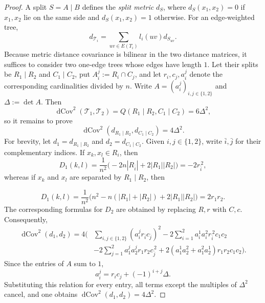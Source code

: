 \documentclass[12pt]{article}
\DeclareMathOperator{\dCov}{dCov}
\begin{document}
\begin{proof}
A split $S=A\mid B$ defines the \emph{split metric} $d_S$, where
$d_S(x_1,x_2)=0$ if $x_1,x_2$ lie on the same side and $d_S(x_1,x_2)=1$
otherwise.  For an edge-weighted tree,
\begin{equation}\label{eq:display-078}
d_{\mathcal T_i}=\sum_{uv\in E(T_i)}l_i(uv)d_{S_{uv}}.
\end{equation}
Because metric distance covariance is bilinear in the two distance
matrices, it suffices to consider two one-edge trees whose edges have
length $1$.  Let their splits be $R_1\mid R_2$ and $C_1\mid C_2$, put
$A_i^j:=R_i\cap C_j$, and let $r_i,c_j,a_i^j$ denote the corresponding
cardinalities divided by $n$.  Write $A=(a_i^j)_{i,j\in\{1,2\}}$ and
$\Delta:=\det A$.
Then
\begin{equation}\label{eq:display-079}
\dCov^2(\mathcal T_1,\mathcal T_2)
=Q(R_1\mid R_2,C_1\mid C_2)=6\Delta^2,
\end{equation}
so it remains to prove
\begin{equation}\label{eq:display-080}
\dCov^2(d_{R_1\mid R_2},d_{C_1\mid C_2})=4\Delta^2.
\end{equation}
For brevity, let $d_1=d_{R_1\mid R_2}$ and
$d_2=d_{C_1\mid C_2}$.  Given $i,j\in\{1,2\}$, write $\bar i,\bar j$
for their complementary indices.  If $x_k,x_l\in R_i$, then
\begin{equation}\label{eq:display-081}
D_1(k,l)=\frac1{n^2}
\bigl(-2n|R_{\bar i}|+2|R_1||R_2|\bigr)=-2r_{\bar i}^{\,2},
\end{equation}
whereas if $x_k$ and $x_l$ are separated by $R_1\mid R_2$, then

\begin{equation}\label{eq:display-082}
D_1(k,l)=\frac1{n^2}
\bigl(n^2-n(|R_1|+|R_2|)+2|R_1||R_2|\bigr)=2r_1r_2.
\end{equation}
The corresponding formulas for $D_2$ are obtained by replacing $R,r$
with $C,c$.  Consequently,
\begin{equation}\label{eq:display-083}
\begin{aligned}
\dCov^2(d_1,d_2)=4\Biggl(&
\sum_{i,j\in\{1,2\}}(a_i^j r_{\bar i}c_{\bar j})^2
-2\sum_{i=1}^2a_i^1a_i^2r_{\bar i}^{\,2}c_1c_2\\
&-2\sum_{j=1}^2a_1^ja_2^jr_1r_2c_{\bar j}^{\,2}
+2(a_1^1a_2^2+a_1^2a_2^1)r_1r_2c_1c_2\Biggr).
\end{aligned}
\end{equation}
Since the entries of $A$ sum to $1$,
\begin{equation}\label{eq:display-084}
a_i^j=r_ic_j+(-1)^{i+j}\Delta.
\end{equation}
Substituting this relation for every entry, all terms except the
multiples of $\Delta^2$ cancel, and one obtains
$\dCov^2(d_1,d_2)=4\Delta^2$.
\end{proof}
\end{document}

